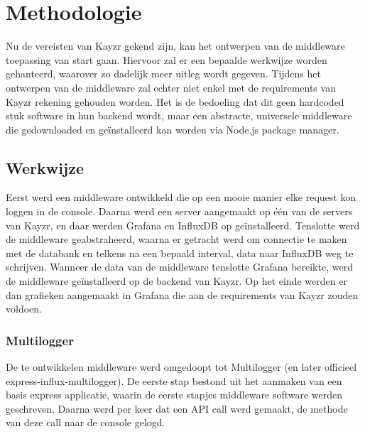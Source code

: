 \chapter{Methodologie}
\label{ch:methodologie}


Nu de vereisten van Kayzr gekend zijn, kan het ontwerpen van de middleware toepassing van start gaan. Hiervoor zal er een bepaalde werkwijze worden gehanteerd, waarover zo dadelijk meer uitleg wordt gegeven. Tijdens het ontwerpen van de middleware zal echter niet enkel met de requirements van Kayzr rekening gehouden worden. Het is de bedoeling dat dit geen hardcoded stuk software in hun backend wordt, maar een abstracte, universele middleware die gedownloaded en geïnstalleerd kan worden via Node.js package manager.  

\section{Werkwijze}
\label{sec:werkwijze}

Eerst werd een middleware ontwikkeld die op een mooie manier elke request kon loggen in de console. Daarna werd een server aangemaakt op één van de servers van Kayzr, en daar werden Grafana en InfluxDB op geïnstalleerd. Tenslotte werd de middleware geabstraheerd, waarna er getracht werd om connectie te maken met de databank en telkens na een bepaald interval, data naar InfluxDB weg te schrijven. Wanneer de data van de middleware tenslotte Grafana bereikte, werd de middleware geïnstalleerd op de backend van Kayzr. Op het einde werden er dan grafieken aangemaakt in Grafana die aan de requirements van Kayzr zouden voldoen. 

\subsection{Multilogger}
\label{sec:multilogger}

De te ontwikkelen middleware werd omgedoopt tot Multilogger (en later officieel express-influx-multilogger). De eerste stap bestond uit het aanmaken van een basis express applicatie, waarin de eerste stapjes middleware software werden geschreven. Daarna werd per keer dat een API call werd gemaakt, de methode van deze call naar de console  gelogd.


